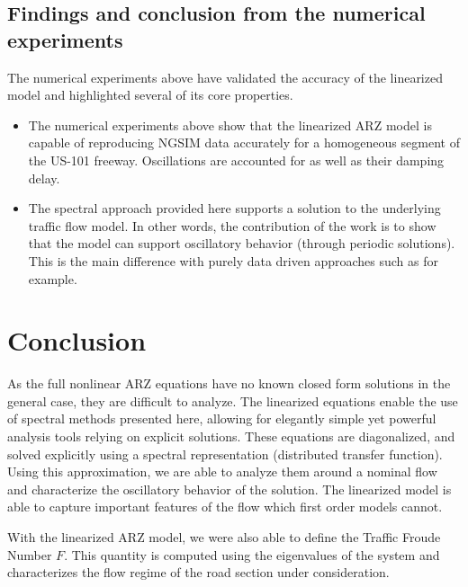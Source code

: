 \documentclass[preprint]{elsarticle}
\begin{document}
\subsection{Findings and conclusion from the numerical experiments}
The numerical experiments above have validated the accuracy of the linearized model and highlighted several of its core properties.
\begin{itemize}
\item The numerical experiments above show that the linearized ARZ model is capable of reproducing NGSIM data accurately for a homogeneous segment of the US-101 freeway. Oscillations are accounted for as well as their damping delay.
\item The spectral approach provided here supports a solution to the underlying traffic flow model. In other words, the contribution of the work is to show that the model can support oscillatory behavior (through periodic solutions). This is the main difference with purely data driven approaches such as \cite{Zheng2011} for example.
\end{itemize}


\section{Conclusion}

As the full nonlinear ARZ equations have no known closed form solutions in the general case, they are difficult to analyze. The linearized equations enable the use of spectral methods presented here, allowing for elegantly simple yet powerful analysis tools relying on explicit solutions. These equations are diagonalized, and solved explicitly using a spectral representation (distributed transfer function). Using this approximation, we are able to analyze them around a nominal flow and characterize the oscillatory behavior of the solution. The linearized model is able to capture important features of the flow which first order models cannot. 

With the linearized ARZ model, we were also able to define the Traffic Froude Number $F$. This quantity is computed using the eigenvalues of the system and characterizes the flow regime of the road section under consideration.

\end{document}
